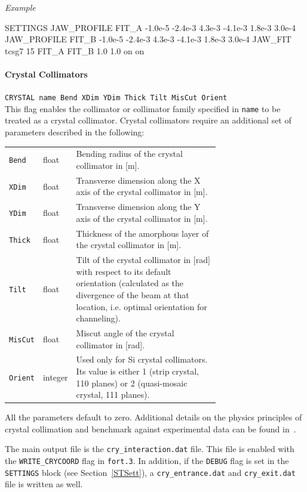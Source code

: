 \bigskip
\noindent\textit{Example}
\begin{cverbatim}
SETTINGS
JAW_PROFILE FIT_A -1.0e-5 -2.4e-3 4.3e-3 -4.1e-3 1.8e-3 3.0e-4
JAW_PROFILE FIT_B -1.0e-5 -2.4e-3 4.3e-3 -4.1e-3 1.8e-3 3.0e-4
JAW_FIT tcsg7 15 FIT_A FIT_B 1.0 1.0 on on
\end{cverbatim}

\paragraph{Crystal Collimators} \texttt{CRYSTAL name Bend XDim YDim Thick Tilt MisCut Orient}\\

This flag enables the collimator or collimator family specified in \texttt{name} to be treated as a crystal collimator.
Crystal collimators require an additional set of parameters described in the following:

\bigskip
\begin{tabular}{@{}llp{0.7\linewidth}}
    \texttt{Bend}   & float   & Bending radius of the crystal collimator in [m]. \\
    \texttt{XDim}   & float   & Transverse dimension along the X axis of the crystal collimator in [m]. \\
    \texttt{YDim}   & float   & Transverse dimension along the Y axis of the crystal collimator in [m]. \\
    \texttt{Thick}  & float   & Thickness of the amorphous layer of the crystal collimator in [m]. \\
    \texttt{Tilt}   & float   & Tilt of the crystal collimator in [rad] with respect to its default orientation (calculated as the divergence of the beam at that location, i.e. optimal orientation for channeling). \\
    \texttt{MisCut} & float   & Miscut angle of the crystal collimator in [rad]. \\
    \texttt{Orient} & integer & Used only for Si crystal collimators. Its value is either 1 (strip crystal, 110 planes) or 2 (quasi-mosaic crystal, 111 planes). \\
\end{tabular}

\bigskip
All the parameters default to zero.
Additional details on the physics principles of crystal collimation and benchmark against experimental data can be found in~\cite{crystal:1,crystal:2,crystal:3,crystal:4,crystal:5,crystal:6}.

The main output file is the \texttt{cry\_interaction.dat} file.
This file is enabled with the \texttt{WRITE\_CRYCOORD} flag in \texttt{fort.3}.
In addition, if the \texttt{DEBUG} flag is set in the \texttt{SETTINGS} block (see Section~\ref{STSett}), a \texttt{cry\_entrance.dat} and \texttt{cry\_exit.dat} file is written as well.

